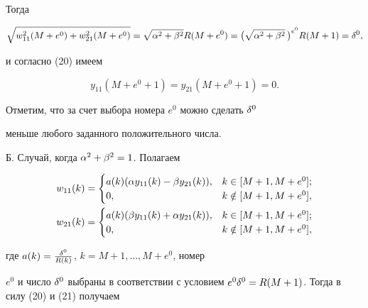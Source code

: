 Тогда


$$


\sqrt{w_{11}^2(M+e^0) + w_{21}^2(M+e^0)} =


\sqrt{\a^2 + \b^2}R(M+e^0) =


\big(\sqrt{\a^2 + \b^2}\,\big)^{e^0}R(M+1) = \d^0,


$$


и согласно (20) имеем


\begin{equation}


y_{11}(M+e^0+1)= y_{21}(M+e^0+1) = 0.


\end{equation}


Отметим, что за счет выбора номера $e^0 $ можно сделать $\delta^0 $


меньше любого заданного положительного числа.





Б. Случай, когда $\alpha^2 + \beta^2 = 1$. Полагаем


\begin{align*}


w_{11}(k) &=


\begin{cases}


a(k)(\a y_{11}(k) - \b y_{21}(k)),& k \in [M+1, M+e^0]; \\


 0,& k \notin [M+1,M+e^0],


\end{cases}


%


\\


w_{21}(k) &=


\begin{cases}


a(k)(\b y_{11}(k) + \a y_{21}(k)),& k \in [M+1, M+e^0]; \\


0,& k \notin [M+1,M+e^0],


\end{cases}


\end{align*}


где $a(k) = \frac{\delta^0}{R(k)}$, $k = M+1, \dotsc, M+e^0$, номер


$e^0 $ и число $\d^0$ выбраны в соответствии с условием $e^0\d^0 =


R(M+1)$. Тогда в силу (20) и (21) получаем


